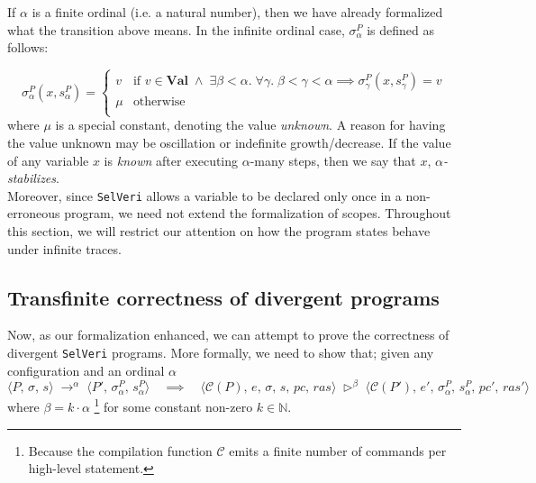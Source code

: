 \documentclass{article}
\begin{document}
If $\alpha$ is a finite ordinal (i.e. a natural number), then we have already formalized what the transition above means. In the infinite ordinal case, $\sigma^P_\alpha$ is defined as follows:

\[
\sigma^P_\alpha(x, s^P_\alpha)  = 
\begin{cases}
    v & \text{if $v \in \textbf{Val} \;\land\; \exists \beta < \alpha .\; \forall \gamma .\; \beta < \gamma < \alpha \implies \sigma^P_\gamma(x, s^P_\gamma) = v$} \\
    \mu & \text{otherwise} \\
\end{cases}
\] where $\mu$ is a special constant, denoting the value \textit{unknown}. A reason for having the value unknown may be oscillation or indefinite growth/decrease. If the value of any variable $x$ is \textit{known} after executing $\alpha$-many steps, then we say that $x$, \textit{$\alpha$-stabilizes}. \\

Moreover, since \texttt{SelVeri} allows a variable to be declared only once in a non-erroneous program, we need not extend the formalization of scopes. Throughout this section, we will restrict our attention on how the program states behave under infinite traces.

\subsection{Transfinite correctness of divergent programs}

Now, as our formalization enhanced, we can attempt to prove the correctness of divergent \texttt{SelVeri} programs. More formally, we need to show that; given any configuration and an ordinal $\alpha$ 
\[
\langle P,\, \sigma,\, s \rangle \; \rightarrow^\alpha \; \langle P',\, \sigma^P_\alpha,\, s^P_\alpha \rangle \quad \implies \quad 
\langle \mathcal{C}(P),\, e,\, \sigma,\, s,\, pc,\, ras \rangle \; \triangleright^\beta \; \langle \mathcal{C}(P'),\, e',\, \sigma^P_\alpha,\, s^P_\alpha,\, pc',\, ras' \rangle 
\] where $\beta = k  \cdot \alpha$ \footnote{Because the compilation function $\mathcal{C}$ emits a finite number of commands per high-level statement.} for some constant non-zero $k \in \mathbb{N}$. 
\end{document}
